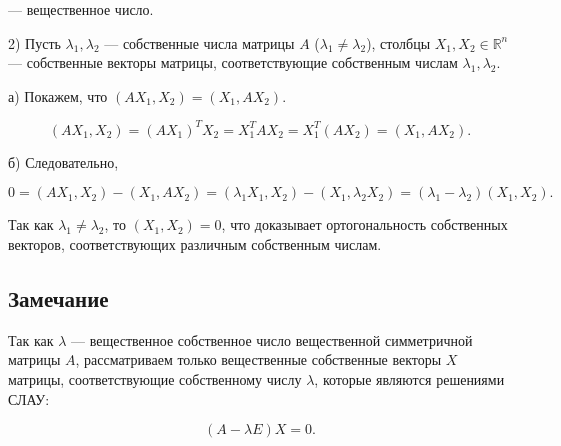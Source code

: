 {— вещественное число.

2) Пусть \( \lambda_1, \lambda_2 \) — собственные числа матрицы \( A \) (\( \lambda_1 \neq \lambda_2 \)), столбцы \( X_1, X_2 \in \mathbb{R}^n \) — собственные векторы матрицы, соответствующие собственным числам \( \lambda_1, \lambda_2 \).

а) Покажем, что \( (A X_1, X_2) = (X_1, A X_2) \).



\[
(A X_1, X_2) = (A X_1)^T X_2 = X_1^T A X_2 = X_1^T (A X_2) = (X_1, A X_2).
\]



б) Следовательно,



\[
0 = (A X_1, X_2) - (X_1, A X_2) = (\lambda_1 X_1, X_2) - (X_1, \lambda_2 X_2) = (\lambda_1 - \lambda_2) (X_1, X_2).
\]



Так как \( \lambda_1 \neq \lambda_2 \), то \( (X_1, X_2) = 0 \), что доказывает ортогональность собственных векторов, соответствующих различным собственным числам.

\subsection*{Замечание}

Так как \( \lambda \) — вещественное собственное число вещественной симметричной матрицы \( A \), рассматриваем только вещественные собственные векторы \( X \) матрицы, соответствующие собственному числу \( \lambda \), которые являются решениями СЛАУ:



\[
(A - \lambda E) X = 0.
\]




}